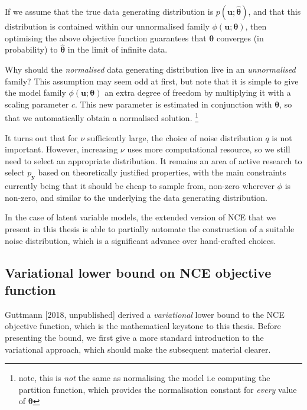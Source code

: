 \documentclass[11pt, oneside]{article}
\newcommand{\thetab}{{\boldsymbol{\theta}}}
\newcommand{\thetaHat}{{\hat{\thetab}}}
\newcommand{\pnorm}{p}
\newcommand{\pnn}{\phi}
\newcommand{\pnoise}{p_{ \mathbf y}}
\renewcommand{\u}{{\mathbf u}}
\begin{document}
If we assume that the true data generating distribution is $\pnorm(\u; \thetaHat)$, and that this distribution is contained within our unnormalised family $\phi(\u;\thetab)$, then optimising the above objective function guarantees that $\thetab$ converges (in probability) to $\thetaHat$ in the limit of infinite data.

Why should the \emph{normalised} data generating distribution live in an \emph{unnormalised} family? This assumption may seem odd at first, but note that it is simple to give the model family $\pnn(\u; \thetab)$ an extra degree of freedom by multiplying it with a scaling parameter $c$. This new parameter is estimated in conjunction with $\thetab$, so that we automatically obtain a normalised solution. \footnote{note, this is \emph{not} the same as normalising the model i.e computing the partition function, which provides the normalisation constant for \emph{every} value of $\thetab$}

It turns out that for $\nu$ sufficiently large, the choice of noise distribution $q$ is not important. However, increasing $\nu$ uses more computational resource, so we still need to select an appropriate distribution. It remains an area of active research to select $\pnoise$ based on theoretically justified properties, with the main constraints currently being that it should be cheap to sample from, non-zero wherever $\pnn$ is non-zero, and similar to the underlying the data generating distribution.

In the case of latent variable models, the extended version of NCE that we present in this thesis is able to partially automate the construction of a suitable noise distribution, which is a significant advance over hand-crafted choices.




\subsection{Variational lower bound on NCE objective function}
\label{sec:variational NCE}
Guttmann [2018, unpublished] derived a \emph{variational} lower bound to the NCE objective function, which is the mathematical keystone to this thesis. Before presenting the bound, we first give a more standard introduction to the variational approach, which should make the subsequent material clearer.
\end{document}
